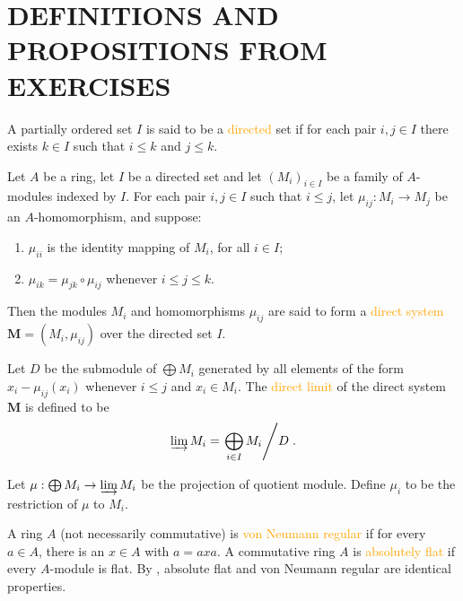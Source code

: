 \section*{DEFINITIONS AND PROPOSITIONS FROM EXERCISES}

\begin{definition}
	A partially ordered set $I$ is said to be a \textcolor{orange}{directed} set if for each pair $i, j\in I$ there exists $k\in I$ such that $i\leqslant k$ and $j\leqslant k$.
	
Let $A$ be a ring, let $I$ be a directed set and let $\left(M_i\right)_{i\in I}$ be a family of $A$-modules indexed by $I$. For each pair $i, j\in I$ such that $i\leqslant j$, let $\mu_{ij}:M_i\rightarrow M_j$ be an $A$-homomorphism, and suppose:
\begin{enumerate}[label=\textup{(\arabic*)}]
		\item $\mu_{ii}$ is the identity mapping of $M_i$, for all $i\in I$;
		\item $\mu_{ik}=\mu_{jk}\circ\mu_{ij}$ whenever $i\leqslant j\leqslant k$.
\end{enumerate}
Then the modules $M_i$ and homomorphisms $\mu_{ij}$ are said to form a \textcolor{orange}{direct system} $\bm{M}=(M_i,\mu_{ij})$ over the directed set $I$.
	
Let $D$ be the submodule of $\bigoplus M_i$ generated by all elements of the form $x_i-\mu_{ij}(x_i)$ whenever $i\leqslant j$ and $x_i\in M_i$. The \textcolor{orange}{direct limit} of the direct system $\bm{M}$ is defined to be
\begin{equation*}
		\varinjlim M_i=\left.\bigoplus_{i\in I}M_i\middle/D\right..
\end{equation*}
	
Let $\mu:\bigoplus M_i\rightarrow\varinjlim M_i$ be the projection of quotient module. Define $\mu_i$ to be the restriction of $\mu$ to $M_i$.
\end{definition}

\begin{definition}
	A ring $A$ (not necessarily commutative) is \textcolor{orange}{von Neumann regular} if for every $a\in A$, there is an $x\in A$ with $a=axa$. A commutative ring $A$ is \textcolor{orange}{absolutely flat} if every $A$-module is flat. By , absolute flat and von Neumann regular are identical properties.
\end{definition}
